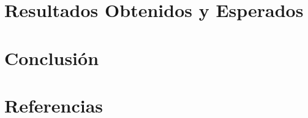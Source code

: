 \documentclass[a4paper,10pt]{article}
\begin{document}
	\section{Resultados Obtenidos y Esperados}
	
	\section{Conclusión}
	
	\section{Referencias}
	\nocite{*}
	\printbibliography[heading=none]
\end{document}
